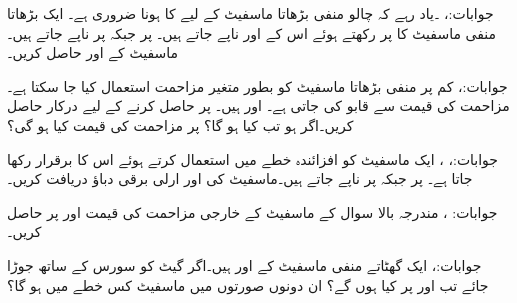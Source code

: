 جوابات:، ۔یاد رہے کہ چالو منفی بڑھاتا ماسفیٹ کے لیے  کا ہونا ضروری ہے۔
ایک بڑھاتا منفی ماسفیٹ کا  پر رکھتے ہوئے اس کے  اور  ناپے جاتے ہیں۔ پر  جبکہ  پر  ناپے جاتے ہیں۔ماسفیٹ کے  اور  حاصل کریں۔

جوابات:، 
کم  پر منفی بڑھاتا ماسفیٹ کو بطور متغیر مزاحمت استعمال کیا جا سکتا ہے۔مزاحمت کی قیمت  سے قابو کی جاتی ہے۔ اور  ہیں۔ پر  حاصل کرنے کے لیے درکار  حاصل کریں۔اگر  ہو تب  کیا ہو گا؟ پر مزاحمت کی قیمت کیا ہو گی؟

جوابات:، ، 
ایک ماسفیٹ کو افزائندہ خطے میں استعمال کرتے ہوئے اس کا  برقرار رکھا جاتا ہے۔  پر  جبکہ  پر  ناپے جاتے ہیں۔ماسفیٹ کی  اور ارلی برقی دباؤ  دریافت کریں۔

جوابات: ، 
مندرجہ بالا سوال کے ماسفیٹ کے خارجی مزاحمت  کی قیمت  اور   پر حاصل کریں۔

جوابات:، 
ایک گھٹاتے منفی ماسفیٹ کے  اور  ہیں۔اگر گیٹ کو سورس کے ساتھ جوڑا جائے تب  اور  پر  کیا ہوں گے؟ ان دونوں صورتوں میں ماسفیٹ کس خطے میں ہو گا؟

